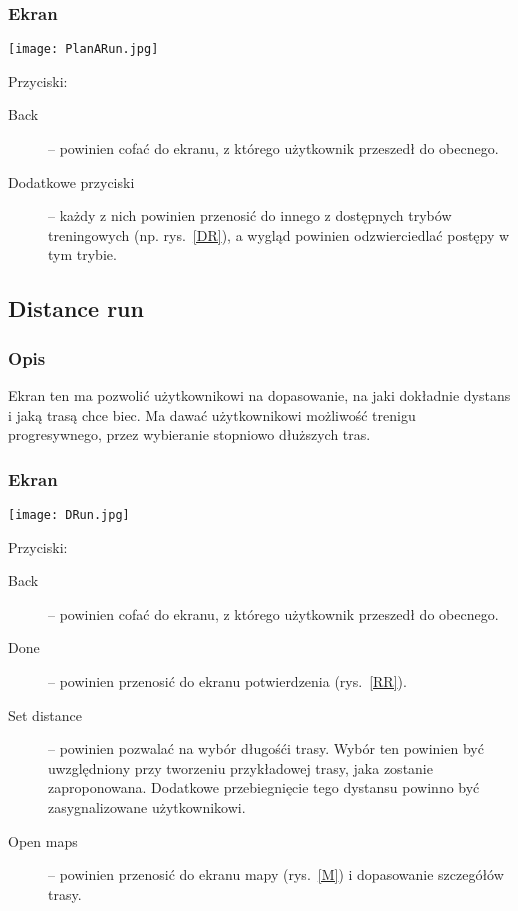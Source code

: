 \subsubsection{Ekran}
\begin{minipage}{0.5\textwidth}
  \texttt{[image: PlanARun.jpg]}
  \label{PR}
\end{minipage}
\begin{minipage}{0.5\textwidth}
Przyciski:\\
\begin{description}
  \item[Back] -- powinien cofać do ekranu, z którego użytkownik przeszedł do obecnego.
  \item[Dodatkowe przyciski] -- każdy z nich powinien przenosić do innego z dostępnych trybów treningowych (np. rys.~\ref{DR}), a wygląd powinien odzwierciedlać postępy w tym trybie.
\end{description}
\end{minipage}
\subsection{Distance run}
\subsubsection{Opis}
\noindent Ekran ten ma pozwolić użytkownikowi na dopasowanie, na jaki dokładnie dystans i jaką trasą chce biec. Ma dawać użytkownikowi możliwość trenigu progresywnego, przez wybieranie stopniowo dłuższych tras.
\subsubsection{Ekran}
\begin{minipage}{0.5\textwidth}
  \texttt{[image: DRun.jpg]}
  \label{DR}
\end{minipage}
\begin{minipage}{0.5\textwidth}
Przyciski:\\
\begin{description}
  \item[Back] -- powinien cofać do ekranu, z którego użytkownik przeszedł do obecnego.
  \item[Done] -- powinien przenosić do ekranu potwierdzenia (rys.~\ref{RR}).
  \item[Set distance] -- powinien pozwalać na wybór długośći trasy. Wybór ten powinien być uwzględniony przy tworzeniu przykładowej trasy, jaka zostanie zaproponowana. Dodatkowe przebiegnięcie tego dystansu powinno być zasygnalizowane użytkownikowi.
  \item[Open maps] -- powinien przenosić do ekranu mapy (rys.~\ref{M}) i dopasowanie szczegółów trasy.
\end{description}
\end{minipage}
